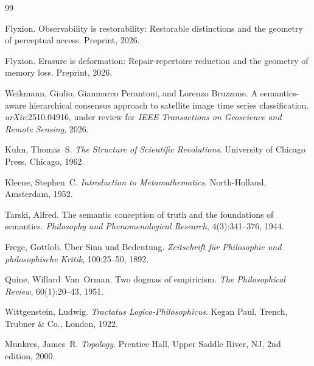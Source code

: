 \documentclass[12pt, oneside]{article}
\theoremstyle{plain}
\theoremstyle{definition}
\theoremstyle{remark}
\begin{document}
\begin{thebibliography}{99}

Flyxion.
\newblock Observability is restorability: Restorable distinctions and the
  geometry of perceptual access.
\newblock Preprint, 2026.

Flyxion.
\newblock Erasure is deformation: Repair-repertoire reduction and the
  geometry of memory loss.
\newblock Preprint, 2026.

Weikmann, Giulio, Gianmarco Perantoni, and Lorenzo Bruzzone.
\newblock A semantics-aware hierarchical consensus approach to satellite image
  time series classification.
\newblock \emph{arXiv}:2510.04916, under review for \emph{IEEE Transactions
  on Geoscience and Remote Sensing}, 2026.

Kuhn, Thomas~S.
\newblock \emph{The Structure of Scientific Revolutions}.
\newblock University of Chicago Press, Chicago, 1962.

Kleene, Stephen~C.
\newblock \emph{Introduction to Metamathematics}.
\newblock North-Holland, Amsterdam, 1952.

Tarski, Alfred.
\newblock The semantic conception of truth and the foundations of semantics.
\newblock \emph{Philosophy and Phenomenological Research}, 4(3):341--376, 1944.

Frege, Gottlob.
\newblock \"{U}ber Sinn und Bedeutung.
\newblock \emph{Zeitschrift f\"{u}r Philosophie und philosophische Kritik},
  100:25--50, 1892.

Quine, Willard~Van~Orman.
\newblock Two dogmas of empiricism.
\newblock \emph{The Philosophical Review}, 60(1):20--43, 1951.

Wittgenstein, Ludwig.
\newblock \emph{Tractatus Logico-Philosophicus}.
\newblock Kegan Paul, Trench, Trubner \& Co., London, 1922.

Munkres, James~R.
\newblock \emph{Topology}.
\newblock Prentice Hall, Upper Saddle River, NJ, 2nd edition, 2000.

\end{thebibliography}
\end{document}
